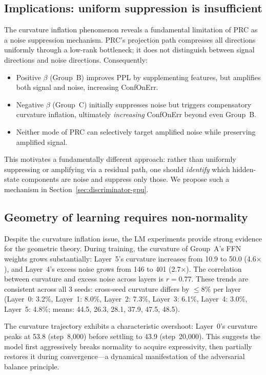 \documentclass[11pt,a4paper]{article}
\theoremstyle{definition}
\begin{document}
\subsection{Implications: uniform suppression is insufficient}

The curvature inflation phenomenon reveals a fundamental
limitation of PRC as a noise suppression mechanism. PRC's
projection path compresses all directions uniformly through a
low-rank bottleneck; it does not distinguish between signal
directions and noise directions. Consequently:
\begin{itemize}[nosep]
  \item Positive $\beta$ (Group~B) improves PPL by supplementing
        features, but amplifies both signal and noise, increasing
        ConfOnErr.
  \item Negative $\beta$ (Group~C) initially suppresses noise but
        triggers compensatory curvature inflation, ultimately
        \emph{increasing} ConfOnErr beyond even Group~B.
  \item Neither mode of PRC can selectively target amplified
        noise while preserving amplified signal.
\end{itemize}

This motivates a fundamentally different approach: rather than
uniformly suppressing or amplifying via a residual path, one
should \emph{identify} which hidden-state components are noise
and suppress only those. We propose such a mechanism in
Section~\ref{sec:discriminator-gpu}.

\subsection{Geometry of learning requires non-normality}

Despite the curvature inflation issue, the LM experiments provide
strong evidence for the geometric theory. During training, the
curvature of Group~A's FFN weights grows substantially: Layer~5's
curvature increases from 10.9 to 50.0 (4.6$\times$), and Layer~4's
excess noise grows from 146 to 401 (2.7$\times$). The correlation
between curvature and excess noise across layers is $r = 0.77$.
These trends are consistent across all 3 seeds: cross-seed
curvature differs by ${\leq}8\%$ per layer
(Layer~0: 3.2\%, Layer~1: 8.0\%, Layer~2: 7.3\%,
Layer~3: 6.1\%, Layer~4: 3.0\%, Layer~5: 4.8\%;
means: 44.5, 26.3, 28.1, 37.9, 47.5, 48.5).

The curvature trajectory exhibits a characteristic overshoot:
Layer~0's curvature peaks at 53.8 (step~8{,}000) before settling
to 43.9 (step~20{,}000). This suggests the model first
aggressively breaks normality to acquire expressivity, then
partially restores it during convergence---a dynamical
manifestation of the adversarial balance principle.
\end{document}
